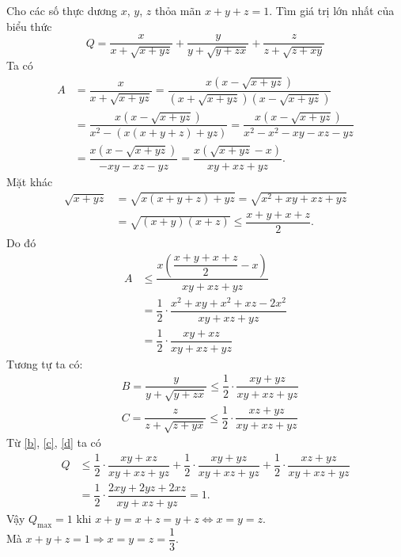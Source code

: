 \begin{ex}%
Cho các số thực dương $x$, $y$, $z$ thỏa mãn $x + y  + z  = 1$. Tìm giá trị lớn nhất của biểu thức   
	$$Q = \dfrac{x}{x + \sqrt{x + yz}} + \dfrac{y}{y + \sqrt{y + zx}} + \dfrac{z}{z + \sqrt{z + xy}}$$ 
\loigiai
{
Ta có
\begin{align*}
A&=\dfrac{x}{x+\sqrt{x+yz}}=\dfrac{x\left(x-\sqrt{x+yz}\right)}{\left(x+\sqrt{x+yz}\right)\left(x-\sqrt{x+yz}\right)} \\ 
& =\dfrac{x\left(x-\sqrt{x+yz}\right)}{x^2-\left(x\left(x+y+z\right)+yz\right)}=\dfrac{x\left(x-\sqrt{x+yz}\right)}{x^2-x^2-xy-xz-yz} \\ 
& =\dfrac{x\left(x-\sqrt{x+yz}\right)}{-xy-xz-yz}=\dfrac{x\left(\sqrt{x+yz}-x\right)}{xy+xz+yz}.
\end{align*} 
Mặt khác 
\begin{align*} \sqrt{x+yz}&=\sqrt{x\left(x+y+z\right)+yz}=\sqrt{x^2+xy+xz+yz} \\
&=\sqrt{\left(x+y\right)\left(x+z\right)}\le \dfrac{x+y+x+z}{2}.
\end{align*} 
Do đó 
\begin{align*}
	A&\le \dfrac{x\left(\dfrac{x+y+x+z}{2}-x\right)}{xy+xz+yz} \\ 
	&=\dfrac{1}{2} \cdot \dfrac{x^2+xy+x^2+xz-2x^2}{xy+xz+yz} \\ 
	&=\dfrac{1}{2} \cdot \dfrac{xy+xz}{xy+xz+yz} \tag{1} \label{b}
\end{align*}
Tương tự ta có:
\begin{align*}
	&B=\dfrac{y}{y+\sqrt{y+zx}}\le \dfrac{1}{2} \cdot \dfrac{xy+yz}{xy+xz+yz} \tag{2} \label{c}\\
	&C=\dfrac{z}{z+\sqrt{z+yx}}\le \dfrac{1}{2} \cdot \dfrac{xz+yz}{xy+xz+yz} \tag{3} \label{d}
\end{align*}
Từ \eqref{b}, \eqref{c}, \eqref{d} ta có 
\begin{align*}
	Q&\le \dfrac{1}{2} \cdot \dfrac{xy+xz}{xy+xz+yz}+\dfrac{1}{2} \cdot \dfrac{xy+yz}{xy+xz+yz}+\dfrac{1}{2} \cdot \dfrac{xz+yz}{xy+xz+yz} \\ 
	& =\dfrac{1}{2} \cdot \dfrac{2xy+2yz+2xz}{xy+xz+yz}=1.
\end{align*} 
Vậy $Q_{\max}=1$ khi $x+y=x+z=y+z\Leftrightarrow x=y=z$.\\
Mà $x+y+z=1\Rightarrow x=y=z=\dfrac{1}{3}.$
}
\end{ex}

